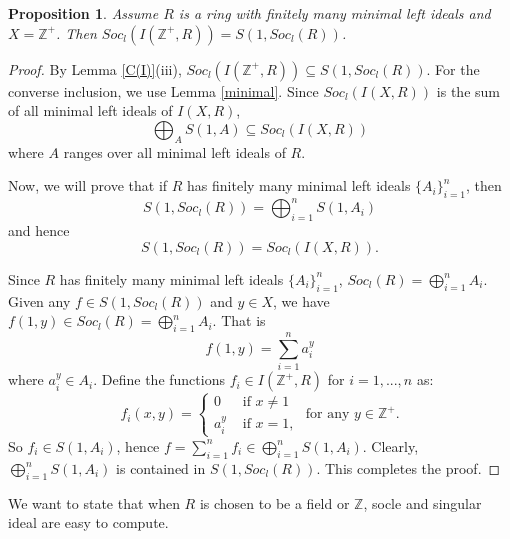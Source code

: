 \documentclass[12pt]{article}
\newtheorem{proposition}[theorem]{Proposition}
\begin{document}
\begin{proposition} \label{main}
	Assume $R$ is a ring with finitely many minimal left ideals and $X=\mathbb{Z}^+$. Then $Soc_l(I(\mathbb{Z}^+,R))=S(1,Soc_l(R))$.
\end{proposition}
\begin{proof}
By Lemma \ref{C(I)}(iii), $Soc_l(I(\mathbb{Z}^+,R)) \subseteq S(1,Soc_l(R))$. For the converse inclusion, we use Lemma \ref{minimal}. 
Since $Soc_l(I(X,R))$ is the sum of all minimal left ideals of $I(X,R)$,
\begin{equation*}
\bigoplus_{A} S(1,A) \subseteq Soc_l(I(X,R))
\end{equation*} where $A$ ranges over all minimal left ideals of $R$. 

Now, we will prove that 
if $R$ has finitely many minimal left ideals $\{A_i \}_{i=1}^n$, then
\begin{equation*}
S(1,Soc_l(R)) = \bigoplus_{i=1}^n S(1,A_i)  
\end{equation*} and hence
\begin{equation*}
S(1,Soc_l(R)) = Soc_l(I(X,R)).
\end{equation*} 

Since $R$ has finitely many minimal left ideals $\{A_i \}_{i=1}^n$, $ Soc_l(R) = \bigoplus_{i=1}^n A_i$.
Given any $f \in S(1,Soc_l(R))$ and $y \in X$, we have $f(1,y) \in Soc_l(R) = \bigoplus_{i=1}^n A_i$. That is 
\begin{equation*}
f(1,y)= \sum_{i=1}^{n} {a^y_{i}}
\end{equation*} where $a^y_{i} \in A_i$. Define the functions  $f_i \in I(\mathbb{Z}^+,R)$ for $i=1, ..., n$ as: 
\begin{equation*} f_i(x,y)= \begin{cases}
 0  & \text{ if } x \neq 1 \\ 
 a^y_{i} & \text{ if }  x = 1, 
\end{cases} 
\text{ for any } y \in \mathbb{Z}^+. 
\end{equation*} 
So $f_i \in S(1,A_i)$, hence $ f= \sum_{i=1}^{n}{f_i} \in \bigoplus_{i=1}^n S(1,A_i)$. Clearly, $\bigoplus_{i=1}^n S(1,A_i)$ is contained in $S(1,Soc_l(R))$. This completes the proof.
\end{proof}

We want to state that when $R$ is chosen to be a field or $\mathbb{Z}$, socle and singular ideal are easy to compute. 
\end{document}
